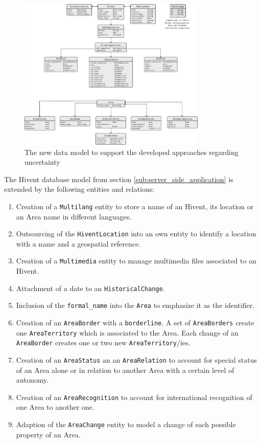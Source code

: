 \begin{figure}[ht]
  \vspace{1em}
  \centering
  \includegraphics[width = 0.8\textwidth]{graphics/extensions/new_database_model}
  \caption{The new data model to support the developed approaches regarding uncertainty}
  \label{fig:new_data_model}
\end{figure}

The Hivent database model from section \ref{sub:server_side_application} is extended by the following entities and relations:

\begin{enumerate}
  \item Creation of a \texttt{Multilang} entity to store a name of an Hivent, its location or an Area name in different languages.
  \item Outsourcing of the \texttt{HiventLocation} into an own entity to identify a location with a name and a geospatial reference.
  \item Creation of a \texttt{Multimedia} entity to manage multimedia files associated to an Hivent.
  \item Attachment of a date to an \texttt{HistoricalChange}.
  \item Inclusion of the \texttt{formal\_name} into the \texttt{Area} to emphasize it as the identifier.
  \item Creation of an \texttt{AreaBorder} with a \texttt{borderline}. A set of \texttt{AreaBorders} create one \texttt{AreaTerritory} which is associated to the Area. Each change of an \texttt{AreaBorder} creates one or two new \texttt{AreaTerritory}/ies.
  \item Creation of an \texttt{AreaStatus} an an \texttt{AreaRelation} to account for special status of an Area alone or in relation to another Area with a certain level of autonomy.
  \item Creation of an \texttt{AreaRecognition} to account for international recognition of one Area to another one.
  \item Adaption of the \texttt{AreaChange} entity to model a change of each possible property of an Area.
\end{enumerate}

